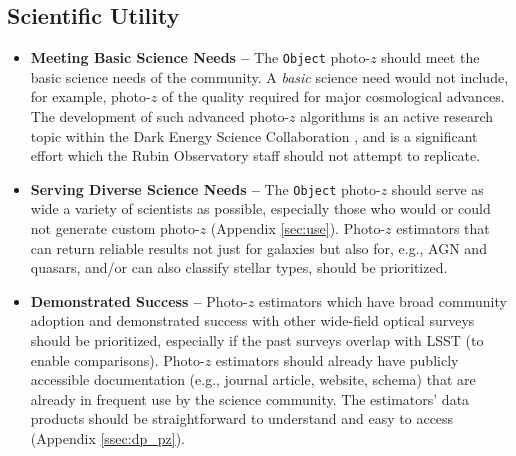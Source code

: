\documentclass[DM,authoryear,toc]{lsstdoc}
\begin{document}
\subsection{Scientific Utility}
\begin{itemize}
\item \textbf{Meeting Basic Science Needs -- } 
The {\tt Object} photo-$z$ should meet the basic science needs of the community.
A {\it basic} science need would not include, for example, photo-$z$ of the quality required for major cosmological advances. 
The development of such advanced photo-$z$ algorithms is an active research topic within the Dark Energy Science Collaboration \citep{2018arXiv180901669T}, and is a significant effort which the Rubin Observatory staff should not attempt to replicate. 
\item \textbf{Serving Diverse Science Needs -- }
The {\tt Object} photo-$z$ should serve as wide a variety of scientists as possible, especially those who would or could not generate custom photo-$z$ (Appendix \ref{sec:use}). 
Photo-$z$ estimators that can return reliable results not just for galaxies but also for, e.g., AGN and quasars, and/or can also classify stellar types, should be prioritized.
\item \textbf{Demonstrated Success -- }
Photo-$z$ estimators which have broad community adoption and demonstrated success with other wide-field optical surveys should be prioritized, especially if the past surveys overlap with LSST (to enable comparisons).
Photo-$z$ estimators should already have publicly accessible documentation (e.g., journal article, website, schema) that are already in frequent use by the science community.
The estimators' data products should be straightforward to understand and easy to access (Appendix \ref{ssec:dp_pz}).
\end{itemize}
\end{document}
